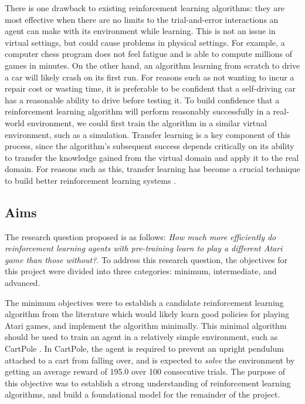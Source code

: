 \documentclass[12pt,a4paper]{article}
\begin{document}
There is one drawback to existing reinforcement learning algorithms: they are most effective when there are no limits to the trial-and-error interactions an agent can make with its environment while learning. This is not an issue in virtual settings, but could cause problems in physical settings. For example, a computer chess program does not feel fatigue and is able to compute millions of games in minutes. On the other hand, an algorithm learning from scratch to drive a car will likely crash on its first run. For reasons such as not wanting to incur a repair cost or wasting time, it is preferable to be confident that a self-driving car has a reasonable ability to drive before testing it. To build confidence that a reinforcement learning algorithm will perform reasonably successfully in a real-world environment, we could first train the algorithm in a similar virtual environment, such as a simulation. Transfer learning is a key component of this process, since the algorithm's subsequent success depends critically on its ability to transfer the knowledge gained from the virtual domain and apply it to the real domain. For reasons such as this, transfer learning has become a crucial technique to build better reinforcement learning systems \cite{}. 

\subsection{Aims}
The research question proposed is as follows: \textit{How much more efficiently do reinforcement learning agents with pre-training learn to play a different Atari game than those without?}. To address this research question, the objectives for this project were divided into three categories: minimum, intermediate, and advanced. 

The minimum objectives were to establish a candidate reinforcement learning algorithm from the literature which would likely learn good policies for playing Atari games, and implement the algorithm minimally. This minimal algorithm should be used to train an agent in a relatively simple environment, such as CartPole \cite{}. In CartPole, the agent is required to prevent an upright pendulum attached to a cart from falling over, and is expected to \textit{solve} the environment by getting an average reward of 195.0 over 100 consecutive trials. The purpose of this objective was to establish a strong understanding of reinforcement learning algorithms, and build a foundational model for the remainder of the project.
\end{document}
